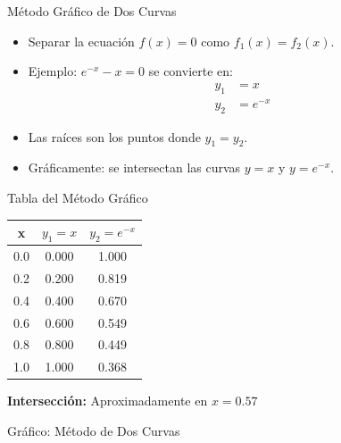 \documentclass[../../main.tex]{subfiles}
\begin{document}
\begin{frame}{Método Gráfico de Dos Curvas}
\begin{itemize}
  \item Separar la ecuación \( f(x) = 0 \) como \( f_1(x) = f_2(x) \).
  \item Ejemplo: \( e^{-x} - x = 0 \) se convierte en:
  \begin{align*}
    y_1 &= x \\
    y_2 &= e^{-x}
  \end{align*}
  \item Las raíces son los puntos donde \( y_1 = y_2 \).
  \item Gráficamente: se intersectan las curvas \( y = x \) y \( y = e^{-x} \).
\end{itemize}
\end{frame}

\begin{frame}{Tabla del Método Gráfico}
\centering
\begin{tabular}{|c|c|c|}
\hline
\textbf{x} & \( y_1 = x \) & \( y_2 = e^{-x} \) \\
\hline
0.0 & 0.000 & 1.000 \\
0.2 & 0.200 & 0.819 \\
0.4 & 0.400 & 0.670 \\
0.6 & 0.600 & 0.549 \\
0.8 & 0.800 & 0.449 \\
1.0 & 1.000 & 0.368 \\
\hline
\end{tabular}

\vspace{1em}
\begin{center}
\textbf{Intersección:} Aproximadamente en \( x = 0.57 \)
\end{center}
\end{frame}

\begin{frame}{Gráfico: Método de Dos Curvas}
\centering
{}
\end{frame}
\end{document}
